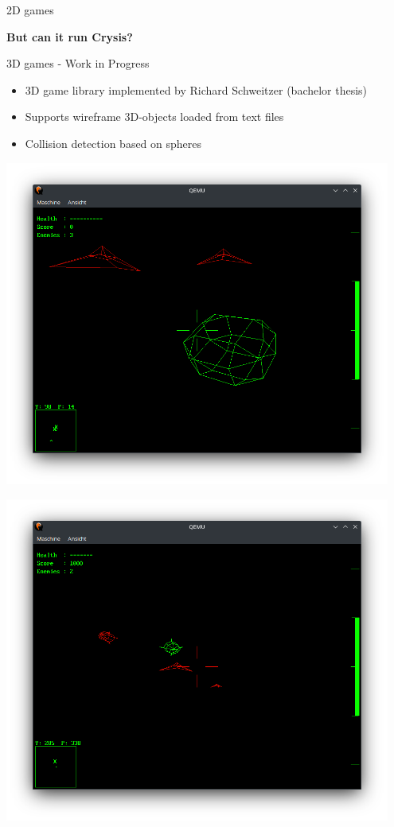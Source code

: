\begin{frame}{2D games}
\begin{minipage}{0.49\textwidth}
	\end{minipage}
	\pause
	\begin{center}
		\textbf{But can it run Crysis?}
	\end{center}
\end{frame}

\begin{frame}{3D games - Work in Progress}
	\begin{itemize}
		\setlength\itemsep{1em}
		\item 3D game library implemented by Richard Schweitzer (bachelor thesis)
		\item Supports wireframe 3D-objects loaded from text files
		\item Collision detection based on spheres
	\end{itemize}
	\begin{minipage}{0.49\textwidth}
		\includegraphics[width=0.95\textwidth]{img/battlezone1}
	\end{minipage}
	\begin{minipage}{0.49\textwidth}
		\includegraphics[width=0.95\textwidth]{img/battlezone2}
	\end{minipage}
\end{frame}
